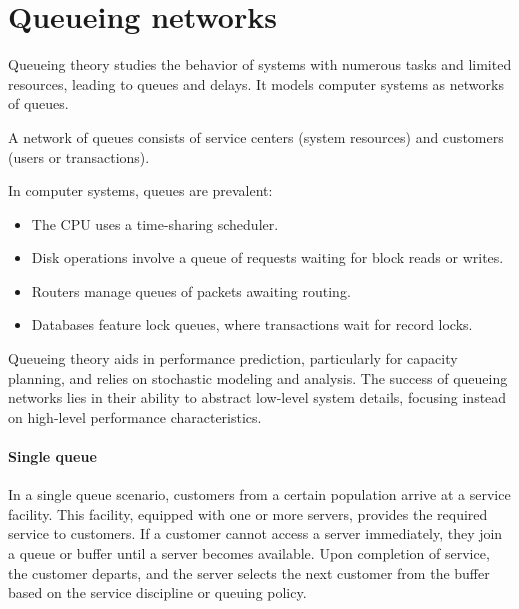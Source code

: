 \section{Queueing networks}

Queueing theory studies the behavior of systems with numerous tasks and limited resources, leading to queues and delays. 
It models computer systems as networks of queues.
\begin{definition}
    A network of queues consists of service centers (system resources) and customers (users or transactions).
\end{definition}

In computer systems, queues are prevalent:
\begin{itemize}
    \item The CPU uses a time-sharing scheduler.
    \item Disk operations involve a queue of requests waiting for block reads or writes.
    \item Routers manage queues of packets awaiting routing.
    \item Databases feature lock queues, where transactions wait for record locks.
\end{itemize}
Queueing theory aids in performance prediction, particularly for capacity planning, and relies on stochastic modeling and analysis.
The success of queueing networks lies in their ability to abstract low-level system details, focusing instead on high-level performance characteristics.

\paragraph*{Single queue}
In a single queue scenario, customers from a certain population arrive at a service facility.
This facility, equipped with one or more servers, provides the required service to customers.
If a customer cannot access a server immediately, they join a queue or buffer until a server becomes available. 
Upon completion of service, the customer departs, and the server selects the next customer from the buffer based on the service discipline or queuing policy.

